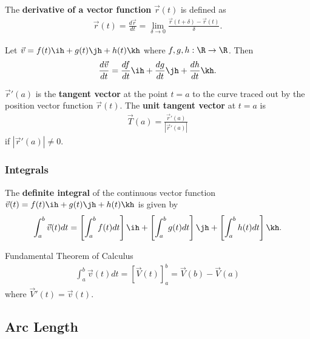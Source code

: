 \documentclass{article}
\begin{document}
\begin{definition}
	The \textbf{derivative of a vector function} $\vec r(t)$ is defined as
	\begin{align*}
		\vec r(t) = \frac{d\vec r}{dt} = \lim_{\delta \to 0} \frac{\vec r(t+\delta)-\vec r(t)}{\delta}.
	\end{align*}
\end{definition}
\begin{theorem}
	Let $\vec v = f(t)\ih + g(t)\jh + h(t)\kh$ where $f,g,h: \R\to\R$. Then
	\begin{align*}
		\frac{d\vec v}{dt} = \frac{df}{dt}\ih + \frac{dg}{dt}\jh + \frac{dh}{dt}\kh.
	\end{align*}
\end{theorem}
\begin{definition}
	$\vec r'(a)$ is the \textbf{tangent vector} at the point $t=a$ to the curve traced out by the position vector function $\vec r(t)$.
	The \textbf{unit tangent vector} at $t=a$ is
	\begin{align*}
		\vec T(a) = \frac{\vec r'(a)}{|\vec r'(a)|}
	\end{align*}
	if $|\vec r'(a)| \not= 0$.
\end{definition}

\subsubsection{Integrals}

\begin{definition}
	The \textbf{definite integral} of the continuous vector function $\vec v(t)=f(t)\ih + g(t)\jh + h(t)\kh$ is given by
	\begin{align*}
		\int_a^b \vec v(t)dt = \left[\int_a^b f(t)dt\right]\ih + \left[\int_a^b g(t) dt\right]\jh + \left[\int_a^b h(t)dt\right] \kh.
	\end{align*}
\end{definition}
\begin{theorem}{Fundamental Theorem of Calculus}
	\begin{align*}
		\int_a^b \vec v(t) dt = \left[\vec V(t)\right]^b_a = \vec V(b) - \vec V(a)
	\end{align*}
	where $\vec V'(t) = \vec v(t)$.
\end{theorem}


\subsection{Arc Length}
\end{document}
